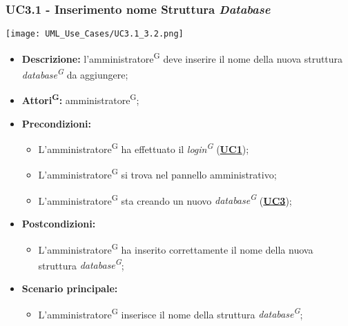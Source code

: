 \subsubsection{UC3.1 - Inserimento nome Struttura \textit{Database}}
\label{sec:UC3.1}
\texttt{[image: UML\_Use\_Cases/UC3.1\_3.2.png]}
\begin{itemize}
	\item \textbf{Descrizione:} l’amministratore\textsuperscript{G} deve inserire il nome della nuova struttura \textit{database\textsuperscript{G}} da aggiungere;
	\item \textbf{Attori\textsuperscript{G}:} amministratore\textsuperscript{G};
	\item \textbf{Precondizioni:} 
	\begin{itemize}
		\item L’amministratore\textsuperscript{G} ha effettuato il \textit{login\textsuperscript{G}} (\hyperref[sec:UC1]{\textbf{UC1}});
		\item L’amministratore\textsuperscript{G} si trova nel pannello amministrativo;
		\item L’amministratore\textsuperscript{G} sta creando un nuovo \textit{database\textsuperscript{G}} (\hyperref[sec:UC3]{\textbf{UC3}});
	\end{itemize}
	\item \textbf{Postcondizioni:} 
	\begin{itemize}
		\item L'amministratore\textsuperscript{G} ha inserito correttamente il nome della nuova struttura  \textit{database\textsuperscript{G}};
	\end{itemize}
	\item \textbf{Scenario principale:} 
	\begin{itemize}
		\item L’amministratore\textsuperscript{G} inserisce il nome della struttura \textit{database\textsuperscript{G}};
	\end{itemize}
\end{itemize}

